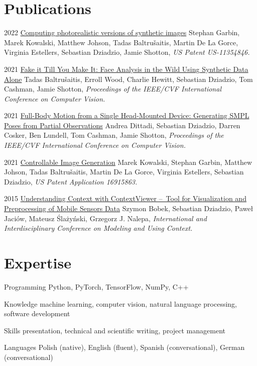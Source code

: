 \documentclass[]{friggeri-cv_osx}
\begin{document}
\section{Publications}
\begin{entrylist}
\entry
{2022}
{\href{https://scholar.google.com/citations?user=8vAIQXoAAAAJ&hl=en}{Computing photorealistic versions of synthetic images}}
{}
{Stephan Garbin, Marek Kowalski, Matthew Johson, Tadas Baltru\v{s}aitis, Martin De La Gorce, Virginia Estellers, Sebastian Dziadzio, Jamie Shotton,
\textit{US Patent US-11354846.}\\}

\entry
{2021}
{\href{https://scholar.google.com/citations?user=8vAIQXoAAAAJ&hl=en}{Fake it Till You Make It: Face Analysis in the Wild Using Synthetic Data Alone}}
{}
{Tadas Baltru\v{s}aitis, Erroll Wood, Charlie Hewitt, Sebastian Dziadzio, Tom Cashman, Jamie Shotton,
\textit{Proceedings of the IEEE/CVF International Conference on Computer Vision.}\\}

\entry
{2021}
{\href{https://scholar.google.com/citations?user=8vAIQXoAAAAJ&hl=en}{Full-Body Motion from a Single Head-Mounted Device: Generating SMPL Poses from Partial Observations}}
{}
{Andrea Dittadi, Sebastian Dziadzio, Darren Cosker, Ben Lundell, Tom Cashman, Jamie Shotton,
\textit{Proceedings of the IEEE/CVF International Conference on Computer Vision.}\\}

\entry
{2021}
{\href{https://scholar.google.com/citations?user=8vAIQXoAAAAJ&hl=en}{Controllable Image Generation}}
{}
{Marek Kowalski, Stephan Garbin, Matthew Johson, Tadas Baltru\v{s}aitis, Martin De La Gorce, Virginia Estellers, Sebastian Dziadzio,
\textit{US Patent Application 16915863.}\\}

\entry
{2015}
{\href{https://scholar.google.com/citations?user=8vAIQXoAAAAJ&hl=en}{Understanding Context with ContextViewer – Tool for Visualization and Preprocessing of Mobile Sensors Data}}
{}
{Szymon Bobek, Sebastian Dziadzio, Paweł Jaciów, Mateusz Ślażyński, Grzegorz J. Nalepa,
\textit{International and Interdisciplinary Conference on Modeling and Using Context.}\\}
\end{entrylist}

\section{Expertise}
\begin{entrylist}
\entry
{}
{Programming}
{}
{Python, PyTorch, TensorFlow, NumPy, C++}

\entry
{}
{Knowledge}
{}
{machine learning, computer vision, natural language processing, software development}

\entry
{}
{Skills}
{}
{presentation, technical and scientific writing, project management}

\entry
{}
{Languages}
{}
{Polish (native), English (fluent), Spanish (conversational), German (conversational)}
\end{entrylist}
\end{document}
